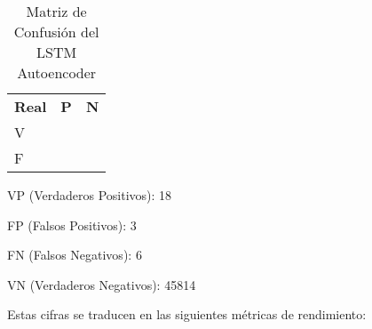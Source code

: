 \begin{table}[ht!]
      \doublespacing
      \small
      \centering
      \begin{tabular}{ >{\centering\arraybackslash}p{3cm} >{\centering\arraybackslash}p{3cm} >{\centering\arraybackslash}p{3cm} }
            \hline
                          & \multicolumn{2}{c}{\textbf{Esperado}}              \\
            \hline
            \textbf{Real} & \textbf{P}                            & \textbf{N} \\
            \hline
            V             & 18                                    & 6      \\
            F             & 3                                     & 45814          \\
            \hline
      \end{tabular}
      \caption{Matriz de Confusión del LSTM Autoencoder}
      \label{tab:confusion_matrix_lstm}
\end{table}

VP (Verdaderos Positivos): 18

FP (Falsos Positivos): 3

FN (Falsos Negativos): 6

VN (Verdaderos Negativos): 45814

Estas cifras se traducen en las siguientes métricas de rendimiento:

